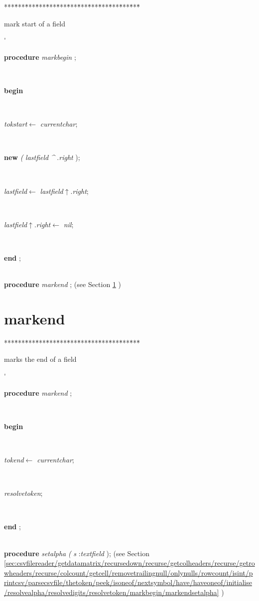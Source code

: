 \begin{tabbing}
***\=***\=***\=***\=***\=***\=***\=***\=***\=***\=***\=***\=***\=\kill
\parbox{3.5cm}{\scriptsize{mark start of a field}}\'\parbox{14cm}{\textsf{\textbf{procedure}  \textit{markbegin} ;}}\\
\+\parbox{14cm}{\textsf{\textbf{begin} }}\\
\parbox{14cm}{\textsf{\textit{tokstart}$\leftarrow$ \textit{currentchar}}; }\\
\parbox{14cm}{\textsf{\textbf{new} \textit{(} \textit{lastfield} \textit{\^{}} .\textit{right} );}}\\
\parbox{14cm}{\textsf{\textit{lastfield}$\leftarrow$ \textit{lastfield}$\uparrow$.\textit{right}}; }\\
\parbox{14cm}{\textsf{\textit{lastfield}$\uparrow$.\textit{right}$\leftarrow$ \textit{nil}}; }\\
\<\-\parbox{14cm}{\textsf{\textbf{end} ;}}\\
\+\textsf{\textbf{procedure}  \textit{markend} ;} (see Section \ref{sec:csvfilereader/getdatamatrix/recursedown/recurse/getcolheaders/recurse/getrowheaders/recurse/colcount/getcell/removetrailingnull/onlynulls/rowcount/isint/printcsv/parsecsvfile/thetoken/peek/isoneof/nextsymbol/have/haveoneof/initialise/resolvealpha/resolvedigits/resolvetoken/markbeginmarkend} )\\
\end{tabbing}
\section{markend}\label{sec:csvfilereader/getdatamatrix/recursedown/recurse/getcolheaders/recurse/getrowheaders/recurse/colcount/getcell/removetrailingnull/onlynulls/rowcount/isint/printcsv/parsecsvfile/thetoken/peek/isoneof/nextsymbol/have/haveoneof/initialise/resolvealpha/resolvedigits/resolvetoken/markbeginmarkend}

\begin{tabbing}
***\=***\=***\=***\=***\=***\=***\=***\=***\=***\=***\=***\=***\=\kill
\parbox{3.5cm}{\scriptsize{marks the end of a field}}\'\parbox{14cm}{\textsf{\textbf{procedure}  \textit{markend} ;}}\\
\+\parbox{14cm}{\textsf{\textbf{begin} }}\\
\parbox{14cm}{\textsf{\textit{tokend}$\leftarrow$ \textit{currentchar}}; }\\
\parbox{14cm}{\textsf{\textit{resolvetoken}}; }\\
\<\-\parbox{14cm}{\textsf{\textbf{end} ;}}\\
\+\textsf{\textbf{procedure}  \textit{setalpha} \textit{(} \textit{s} :\textit{textfield} );} (see Section \ref{sec:csvfilereader/getdatamatrix/recursedown/recurse/getcolheaders/recurse/getrowheaders/recurse/colcount/getcell/removetrailingnull/onlynulls/rowcount/isint/printcsv/parsecsvfile/thetoken/peek/isoneof/nextsymbol/have/haveoneof/initialise/resolvealpha/resolvedigits/resolvetoken/markbegin/markendsetalpha} )\\
\end{tabbing}
